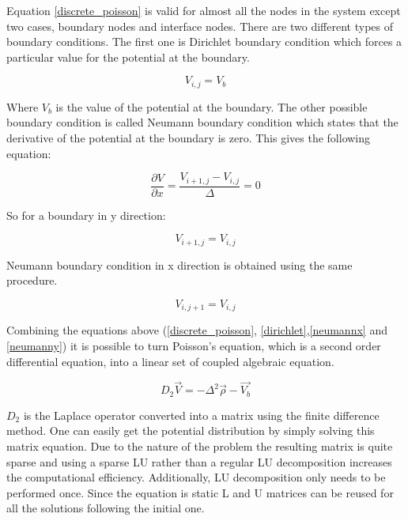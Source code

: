 \begin{doublespace}
Equation \ref{discrete_poisson} is valid for almost all the nodes in the system except two cases, boundary nodes and interface nodes. There are two different types of boundary conditions. The first one is Dirichlet boundary condition which forces a particular value for the potential at the boundary.

\begin{equation}
V_{i,j}=V_{b}
\label{dirichlet}
\end{equation}

Where $V_{b}$ is the value of the potential at the boundary. The other possible boundary condition is called Neumann boundary condition which states that the derivative of the potential at the boundary is zero. This gives the following equation:

\begin{equation}
\frac{\partial V}{\partial x}=\frac{V_{i+1,j}-V_{i,j}}{\Delta}=0
\label{neumannx}
\end{equation}

So for a boundary in y direction:

\begin{equation}
V_{i+1,j}=V_{i,j}
\label{neumanny}
\end{equation}

Neumann boundary condition in x direction is obtained using the same procedure.

\begin{equation}
V_{i,j+1}=V_{i,j}
\end{equation}

Combining the equations above (\ref{discrete_poisson}, \ref{dirichlet},\ref{neumannx} and \ref{neumanny}) it is possible to turn Poisson's equation, which is a second order differential equation, into a linear set of coupled algebraic equation.

\begin{equation}
D_{2}\vec{V}=-\Delta^2\vec{\rho}-\vec{V_b}
\end{equation}

$D_{2}$ is the Laplace operator converted into a matrix using the finite difference method. One can easily get the potential distribution by simply solving this matrix equation. Due to the nature of the problem the resulting matrix is quite sparse and using a sparse LU rather than a regular LU decomposition increases the computational efficiency. Additionally, LU decomposition only needs to be performed once. Since the equation is static L and U matrices can be reused for all the solutions following the initial one. 


\end{doublespace}
